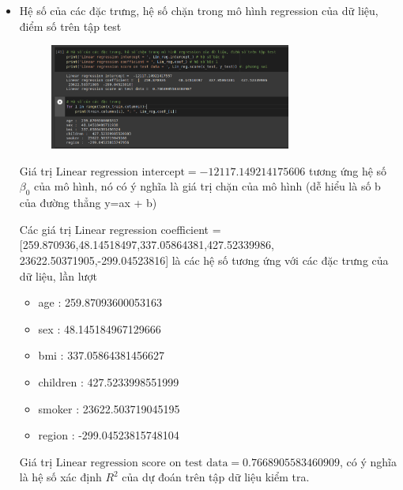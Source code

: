 \documentclass{article}
\begin{document}
\begin{itemize}
		\item Hệ số của các đặc trưng, hệ số chặn trong mô hình regression của dữ liệu, điểm số trên tập test
		\begin{figure}[H]
			\centering
			\includegraphics[width=0.75\textwidth]{images/linear_reg/linear_reg_res.png}
		\end{figure}
		Giá trị $\text{Linear regression intercept} =  -12117.149214175606$ tương ứng hệ số $\beta_0$ của mô hình, nó có ý nghĩa là giá trị chặn của mô hình (dễ hiểu là số b của đường thẳng y=ax + b)
		
		Các giá trị Linear regression coefficient = [259.870936,48.14518497,337.05864381,427.52339986, 23622.50371905,-299.04523816] là các hệ số tương ứng với các đặc trưng của dữ liệu, lần lượt 
		\begin{itemize}
			\item age :  259.87093600053163
			\item sex :  48.145184967129666
			\item bmi :  337.05864381456627
			\item children :  427.5233998551999
			\item smoker :  23622.503719045195
			\item region :  -299.04523815748104
		\end{itemize}
		
		Giá trị $\text{Linear regression score on test data} =  0.7668905583460909 $, có ý nghĩa là hệ số xác định $R^2$ của dự đoán trên tập dữ liệu kiểm tra.
		

\end{itemize}
\end{document}
